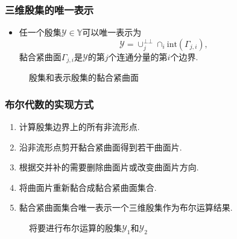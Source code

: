 \documentclass[UTF8]{ctexbeamer}	%
\theoremstyle{plain}
\theoremstyle{definition}
\theoremstyle{remark}
\numberwithin{equation}{section}
\begin{document}
\begin{frame}
    \frametitle{三维殷集的唯一表示}
    \begin{itemize}
        \item 任一个殷集$\mathcal{Y} \in \mathbb{Y}$可以唯一表示为
              \[\mathcal{Y} = \cup_j^{\bot \bot} \cap_i \text{int}(\Gamma_{j, i}),\]
              黏合紧曲面$\Gamma_{j, i}$是$\mathcal{Y}$的第$j$个连通分量的第$i$个边界.
    \end{itemize}
    \begin{figure}[htbp]
        \centering
         \qquad
        \caption{殷集和表示殷集的黏合紧曲面}
        \vspace{0.2in}
    \end{figure}
\end{frame}

\begin{frame}
    \frametitle{布尔代数的实现方式}
    \begin{enumerate}
        \item 计算殷集边界上的所有非流形点.
        \item 沿非流形点剪开黏合紧曲面得到若干曲面片.
        \item 根据交并补的需要删除曲面片或改变曲面片方向.
        \item 将曲面片重新黏合成黏合紧曲面集合.
        \item 黏合紧曲面集合唯一表示一个三维殷集作为布尔运算结果.
    \end{enumerate}
    \begin{figure}[!htb]
        \centering
         \qquad
        \caption{将要进行布尔运算的殷集$\mathcal{Y}_1$和$\mathcal{Y}_2$}
        \vspace{0.2in}
    \end{figure}
\end{frame}
\end{document}
